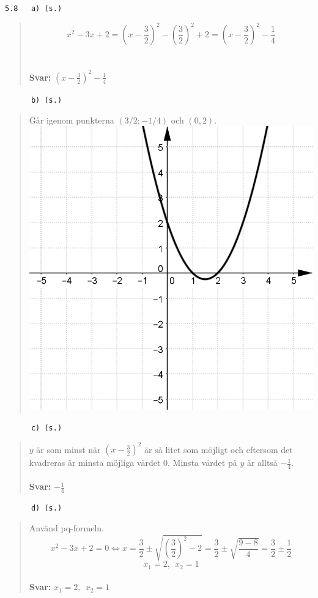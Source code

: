 \documentclass[a4paper]{article}
\newcommand{\tskcol}[1]{\textcolor{tskcol}{#1}}
\begin{document}
	\texttt{\tskcol{5.8~~~a) (s.)}}
	\begin{quotation}
		\noindent
		\[x^2-3x+2=
		\left(x-\frac{3}{2}\right)^2-\left(\frac{3}{2}\right)^2+2=
		\left(x-\frac{3}{2}\right)^2-\frac{1}{4}\]
		\\ \\
		\textbf{Svar:} $\left(x-\frac{3}{2}\right)^2-\frac{1}{4}$
	\end{quotation}
	
	\texttt{\tskcol{~~~~~~b) (s.)}}
	\begin{quotation}
		\noindent
		Går igenom punkterna $(3/2;-1/4)$ och $(0,2)$. \\
		\includegraphics[scale=0.2]{images/58b.png}
	\end{quotation}
	
	\pagebreak
	\texttt{\tskcol{~~~~~~c) (s.)}}
	\begin{quotation}
		\noindent
		$y$ är som minst när $(x-\frac{3}{2})^2$ är så litet som möjligt och eftersom det kvadreras är minsta möjliga värdet 0. Minsta värdet på $y$ är alltså $-\frac{1}{4}$. 
		\\ \\
		\textbf{Svar:} $-\frac{1}{4}$
	\end{quotation}
	
	\texttt{\tskcol{~~~~~~d) (s.)}}
	\begin{quotation}
		\noindent
		Använd pq-formeln.
		\[x^2-3x+2=0 \Leftrightarrow
		x=\frac{3}{2}\pm\sqrt{\left(\frac{3}{2}\right)^2-2}=
		\frac{3}{2}\pm\sqrt{\frac{9-8}{4}}=
		\frac{3}{2}\pm\frac{1}{2}\]
		\[x_1=2,~~x_2=1\]
		\\
		\textbf{Svar:} $x_1=2,~~x_2=1$
	\end{quotation}
	
\end{document}
